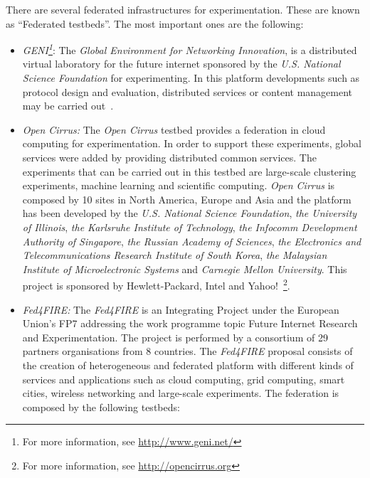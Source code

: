 There are several federated infrastructures for experimentation. These are known
as ``Federated testbeds''. The most important ones are the following:
\begin{itemize}
\item \emph{GENI\footnote{For more information, see
  \url{http://www.geni.net/}}}: The \emph{Global Environment for Networking Innovation}, is a distributed virtual
laboratory for the future internet sponsored by the \emph{U.S. National Science Foundation} for
experimenting. In this platform developments such as protocol
design and evaluation, distributed services or content management may be carried
out~\cite{arriba}.
\item \emph{Open
  Cirrus:} The \emph{Open Cirrus} testbed provides a federation in cloud computing for
experimentation. In order to support these experiments, global services were added by
providing distributed common services. The experiments that can be carried out
in this testbed are large-scale clustering experiments, machine learning and scientific computing. \emph{Open Cirrus} is composed by 10 sites in North
America, Europe and Asia and the platform has been developed by the
\emph{U.S. National Science Foundation}, \emph{the University of
  Illinois},\emph{ the Karlsruhe Institute of Technology}, \emph{the Infocomm Development Authority of Singapore},\emph{ the
Russian Academy of Sciences}, \emph{the Electronics and Telecommunications Research
Institute of South Korea}, \emph{the Malaysian Institute of Microelectronic
  Systems} and \emph{Carnegie Mellon University}. This project is sponsored by Hewlett-Packard, Intel
and Yahoo!~\footnote{For more information, see \url{http://opencirrus.org}}.

\item \emph{Fed4FIRE:} The \emph{Fed4FIRE} is an Integrating Project under the European
Union's \ac{FP7} addressing the work programme topic Future Internet Research
and Experimentation. The project is performed by a consortium of 29 partners
organisations from 8 countries. The \emph{Fed4FIRE}  proposal consists of the
creation of heterogeneous and federated platform with different kinds of services and applications such
as cloud computing, grid computing, smart cities, wireless networking and
large-scale experiments. The federation is composed by the following testbeds:


\end{itemize}
